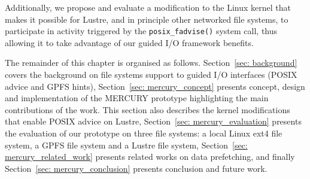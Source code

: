 Additionally, we propose and evaluate a modification to the Linux kernel that makes it possible for Lustre, and in principle other networked file systems, to participate in activity triggered by the \texttt{posix\_fadvise()} system call, thus allowing it to take advantage of our guided I/O framework benefits.

The remainder of this chapter is organised as follows. Section~\ref{sec: background} covers the background on file systems support to guided I/O interfaces (POSIX advice and GPFS hints), Section~\ref{sec: mercury_concept} presents concept, design and implementation of the MERCURY prototype highlighting the main contributions of the work. This section also describes the kernel modifications that enable POSIX advice on Lustre, Section~\ref{sec: mercury_evaluation} presents the evaluation of our prototype on three file systems: a local Linux ext4 file system, a GPFS file system and a Lustre file system, Section~\ref{sec: mercury_related_work} presents related works on data prefetching, and finally Section~\ref{sec: mercury_conclusion} presents conclusion and future work.
